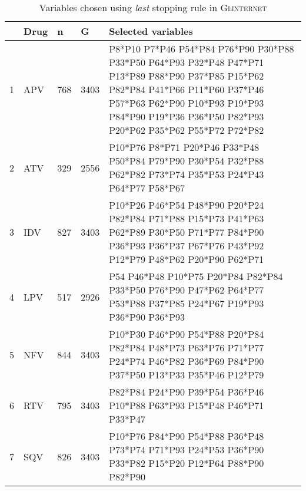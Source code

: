 \begin{table}[ht]
\centering
\begin{tabular}{rllll}
  \hline
 & Drug & n & G & Selected variables \\ 
  \hline
1 & APV & 768 & 3403 & P8*P10 P7*P46 P54*P84 P76*P90 P30*P88 P33*P50 P64*P93 P32*P48 P47*P71 P13*P89 P88*P90 P37*P85 P15*P62 P82*P84 P41*P66 P11*P60 P37*P46 P57*P63 P62*P90 P10*P93 P19*P93 P84*P90 P19*P36 P36*P50 P82*P93 P20*P62 P35*P62 P55*P72 P72*P82 \\ 
  2 & ATV & 329 & 2556 & P10*P76 P8*P71 P20*P46 P33*P48 P50*P84 P79*P90 P30*P54 P32*P88 P62*P82 P73*P74 P35*P53 P24*P43 P64*P77 P58*P67 \\ 
  3 & IDV & 827 & 3403 & P10*P26 P46*P54 P48*P90 P20*P24 P82*P84 P71*P88 P15*P73 P41*P63 P62*P89 P30*P50 P71*P77 P84*P90 P36*P93 P36*P37 P67*P76 P43*P92 P12*P79 P48*P62 P20*P90 P62*P71 \\ 
  4 & LPV & 517 & 2926 & P54 P46*P48 P10*P75 P20*P84 P82*P84 P33*P50 P76*P90 P47*P62 P64*P77 P53*P88 P37*P85 P24*P67 P19*P93 P36*P90 P36*P93 \\ 
  5 & NFV & 844 & 3403 & P10*P30 P46*P90 P54*P88 P20*P84 P82*P84 P48*P73 P63*P76 P71*P77 P24*P74 P46*P82 P36*P69 P84*P90 P37*P50 P13*P33 P35*P46 P12*P79 \\ 
  6 & RTV & 795 & 3403 & P82*P84 P24*P90 P39*P54 P36*P46 P10*P88 P63*P93 P15*P48 P46*P71 P33*P47 \\ 
  7 & SQV & 826 & 3403 & P10*P76 P84*P90 P54*P88 P36*P48 P73*P74 P71*P93 P24*P53 P36*P90 P33*P82 P15*P20 P12*P64 P88*P90 P82*P90 \\ 
   \hline
\end{tabular}
\caption{Variables chosen using \textit{last} stopping rule in \textsc{Glinternet}} 
\end{table}

